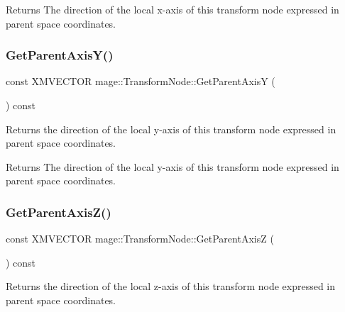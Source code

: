 \begin{DoxyReturn}{Returns}
The direction of the local x-\/axis of this transform node expressed in parent space coordinates. 
\end{DoxyReturn}
\hypertarget{structmage_1_1_transform_node_a5d5138bb149828fa78da166129f996b1}{}\label{structmage_1_1_transform_node_a5d5138bb149828fa78da166129f996b1} 
\subsubsection{\texorpdfstring{Get\+Parent\+Axis\+Y()}{GetParentAxisY()}}
{\footnotesize\ttfamily const X\+M\+V\+E\+C\+T\+OR mage\+::\+Transform\+Node\+::\+Get\+Parent\+AxisY (\begin{DoxyParamCaption}{ }\end{DoxyParamCaption}) const\hspace{0.3cm}{\ttfamily [noexcept]}}

Returns the direction of the local y-\/axis of this transform node expressed in parent space coordinates.

\begin{DoxyReturn}{Returns}
The direction of the local y-\/axis of this transform node expressed in parent space coordinates. 
\end{DoxyReturn}
\hypertarget{structmage_1_1_transform_node_a65188d5be4f0bc4ff8bd822b659309cc}{}\label{structmage_1_1_transform_node_a65188d5be4f0bc4ff8bd822b659309cc} 
\subsubsection{\texorpdfstring{Get\+Parent\+Axis\+Z()}{GetParentAxisZ()}}
{\footnotesize\ttfamily const X\+M\+V\+E\+C\+T\+OR mage\+::\+Transform\+Node\+::\+Get\+Parent\+AxisZ (\begin{DoxyParamCaption}{ }\end{DoxyParamCaption}) const\hspace{0.3cm}{\ttfamily [noexcept]}}

Returns the direction of the local z-\/axis of this transform node expressed in parent space coordinates.

